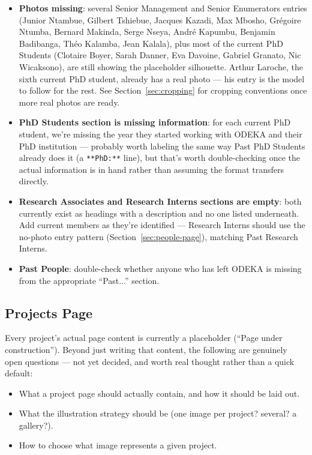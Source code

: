 \documentclass[11pt]{article}
\newcommand{\term}[1]{\textbf{#1}}
\newcommand{\cmd}[1]{\texttt{#1}}
\begin{document}
\begin{itemize}
    \item \term{Photos missing}: several Senior Management and Senior
    Enumerators entries (Junior Ntambue, Gilbert Tshiebue, Jacques
    Kazadi, Max Mbosho, Grégoire Ntumba, Bernard Makinda, Serge Nseya,
    André Kapumbu, Benjamin Badibanga, Théo Kalamba, Jean Kalala),
    plus most of the current PhD Students (Clotaire Boyer, Sarah
    Danner, Eva Davoine, Gabriel Granato, Nic Wicaksono), are still
    showing the placeholder silhouette. Arthur Laroche, the sixth
    current PhD student, already has a real photo --- his entry is the
    model to follow for the rest. See Section~\ref{sec:cropping} for
    cropping conventions once more real photos are ready.
    \item \term{PhD Students section is missing information}: for each
    current PhD student, we're missing the year they started working
    with ODEKA and their PhD institution --- probably worth labeling
    the same way Past PhD Students already does it (a \cmd{**PhD:**}
    line), but that's worth double-checking once the actual information
    is in hand rather than assuming the format transfers directly.
    \item \term{Research Associates and Research Interns sections are
    empty}: both currently exist as headings with a description and no
    one listed underneath. Add current members as they're identified
    --- Research Interns should use the no-photo entry pattern
    (Section~\ref{sec:people-page}), matching Past Research Interns.
    \item \term{Past People}: double-check whether anyone who has left
    ODEKA is missing from the appropriate ``Past...'' section.
\end{itemize}

\subsection{Projects Page}
\label{sec:projects-todo}

Every project's actual page content is currently a placeholder
(``Page under construction''). Beyond just writing that content, the
following are genuinely open questions --- not yet decided, and worth
real thought rather than a quick default:

\begin{itemize}
    \item What a project page should actually contain, and how it
    should be laid out.
    \item What the illustration strategy should be (one image per
    project? several? a gallery?).
    \item How to choose what image represents a given project.
\end{itemize}
\end{document}
